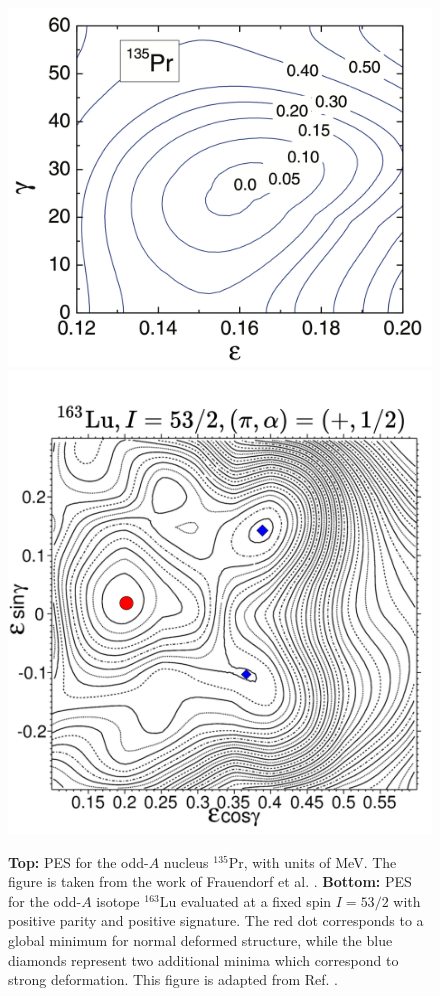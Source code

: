\begin{figure}
    \centering
    \includegraphics[scale=0.17]{Chapters/Figures/135Pr-PES.pdf}
    \includegraphics[scale=0.38]{Chapters/Figures/163Lu-PES.pdf}
    \caption{\textbf{Top:} PES for the odd-$A$ nucleus $^{135}$Pr, with units of MeV. The figure is taken from the work of Frauendorf et al. \cite{frauendorf2014transverse}. \textbf{Bottom:} PES for the odd-$A$ isotope $^{163}$Lu evaluated at a fixed spin $I=53/2$ with positive parity and positive signature. The red dot corresponds to a global minimum for normal deformed structure, while the blue diamonds represent two additional minima which correspond to strong deformation. This figure is adapted from Ref. \cite{jensen2002wobbling}.}
    \label{pes-example-set-2}
\end{figure}

